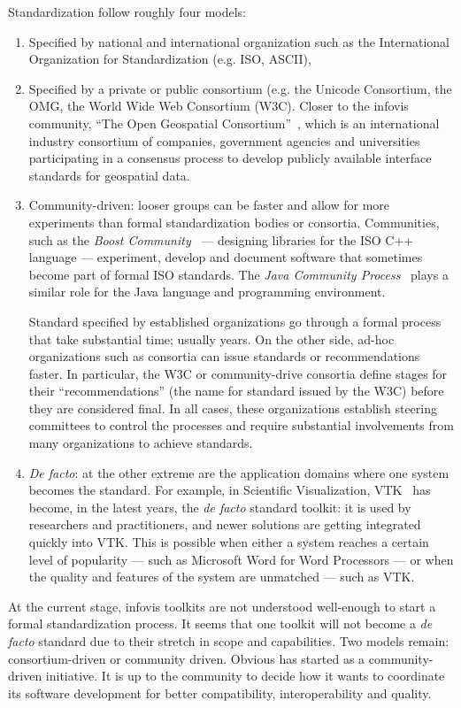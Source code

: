 Standardization follow roughly four models: 
\begin{enumerate}[noitemsep]
\item Specified by national and international organization such as the
  International Organization for Standardization (e.g. ISO, ASCII),

\item Specified by a private or public consortium (e.g. the Unicode
  Consortium, the OMG, the World Wide Web Consortium (W3C). Closer to
  the infovis community, ``The Open Geospatial
  Consortium''~\cite{OpenGeospatial},
  which is an international industry consortium of companies,
  government agencies and universities participating in a consensus
  process to develop publicly available interface standards for
  geospatial data.

\item Community-driven: looser groups can be faster and allow for more
  experiments than formal standardization bodies or consortia.
  Communities, such as the \emph{Boost
    Community}~\cite{Boost} --- designing
  libraries for the ISO C++ language --- experiment, develop and
  document software that sometimes become part of formal ISO
  standards.  The \emph{Java Community
    Process}~\cite{JCP} plays a similar role
  for the Java language and programming environment.

  Standard specified by established organizations go through a formal
  process that take substantial time; usually years.  On the other
  side, ad-hoc organizations such as consortia can issue standards or
  recommendations faster.  In particular, the W3C or community-drive
  consortia define stages for their ``recommendations'' (the name for
  standard issued by the W3C) before they are considered final.  In
  all cases, these organizations establish steering committees to
  control the processes and require substantial involvements from many
  organizations to achieve standards.

\item \textit{De facto}: at the other extreme are the application
  domains where one system becomes the standard.  For example, in
  Scientific Visualization, VTK~\cite{VTK} has become, in the latest
  years, the \textit{de facto} standard toolkit: it is used by
  researchers and practitioners, and newer solutions are getting
  integrated quickly into VTK.  This is possible when either a
  system reaches a certain level of popularity --- such as Microsoft
  Word for Word Processors --- or when the quality and features of the
  system are unmatched --- such as VTK.
\end{enumerate}

At the current stage, infovis toolkits are not
understood well-enough to start a formal standardization process.  It
seems that one toolkit will not become a \textit{de facto} standard
due to their stretch in scope and capabilities.  Two models remain:
consortium-driven or community driven.  Obvious has started as a
community-driven initiative.  It is up to the community to decide how
it wants to coordinate its software development for better
compatibility, interoperability and quality.
